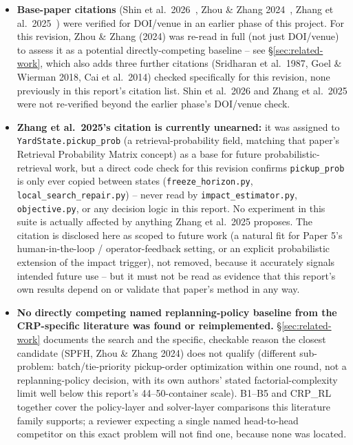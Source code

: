 \documentclass[11pt]{article}
\begin{document}
\begin{itemize}
{    addressed, not fully.} Two real Lee et al.\ instances (20 and 70
    containers) confirm the same pattern found throughout this suite on
    data this project did not construct. Only two instances, both
    ``random'' type, were tried; the full Lee/Shin suite spans up to 720
    containers and an ``upside-down'' variant, left to future work.
  \item \textbf{Base-paper citations} (Shin et al.\ 2026~\cite{shin2026}, Zhou \& Zhang
    2024~\cite{zhou2024}, Zhang et al.\ 2025~\cite{zhang2025}) were verified for DOI/venue in an earlier
    phase of this project. For this revision, Zhou \& Zhang (2024) was
    re-read in full (not just DOI/venue) to assess it as a potential
    directly-competing baseline -- see \S\ref{sec:related-work}, which
    also adds three further citations (Sridharan et al.\ 1987, Goel \&
    Wierman 2018, Cai et al.\ 2014) checked specifically for this
    revision, none previously in this report's citation list. Shin et al.\
    2026 and Zhang et al.\ 2025 were not re-verified beyond the earlier
    phase's DOI/venue check.
  \item \textbf{Zhang et al.\ 2025's citation is currently unearned:} it
    was assigned to \texttt{YardState.pickup\_prob} (a retrieval-probability
    field, matching that paper's Retrieval Probability Matrix concept) as
    a base for future probabilistic-retrieval work, but a direct code
    check for this revision confirms \texttt{pickup\_prob} is only ever
    copied between states (\texttt{freeze\_horizon.py},
    \texttt{local\_search\_repair.py}) -- never read by
    \texttt{impact\_estimator.py}, \texttt{objective.py}, or any decision
    logic in this report. No experiment in this suite is actually
    affected by anything Zhang et al.\ 2025 proposes. The citation is
    disclosed here as scoped to future work (a natural fit for Paper 5's
    human-in-the-loop / operator-feedback setting, or an explicit
    probabilistic extension of the impact trigger), not removed, because
    it accurately signals intended future use -- but it must not be read
    as evidence that this report's own results depend on or validate
    that paper's method in any way.
  \item \textbf{No directly competing named replanning-policy baseline
    from the CRP-specific literature was found or reimplemented.}
    \S\ref{sec:related-work} documents the search and the specific,
    checkable reason the closest candidate (SPFH, Zhou \& Zhang 2024) does
    not qualify (different sub-problem: batch/tie-priority pickup-order
    optimization within one round, not a replanning-policy decision, with
    its own authors' stated factorial-complexity limit well below this
    report's 44--50-container scale). B1--B5 and CRP\_RL together cover
    the policy-layer and solver-layer comparisons this literature family
    supports; a reviewer expecting a single named head-to-head competitor
    on this exact problem will not find one, because none was located.
\end{itemize}
\end{document}
